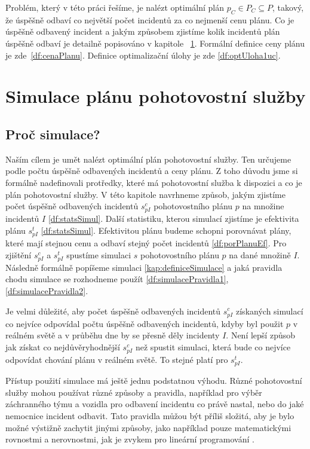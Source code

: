Problém, který v této práci řešíme, je nalézt optimální plán $p_C \in P_C \subseteq P$, takový, že úspěšně odbaví co největší počet incidentů za co nejmenší cenu plánu.
Co je úspěšně odbavený incident a jakým způsobem zjistíme kolik incidentů plán úspěšně odbaví je detailně popisováno v kapitole ~\ref{SimulaceKap}.
Formální definice ceny plánu je zde~\ref{df:cenaPlanu}.
Definice optimalizační úlohy je zde \ref{df:optUloha1uc}.

\section{Simulace plánu pohotovostní služby}\label{SimulaceKap}

\subsection{Proč simulace?}\label{kap:procSimulace}

Naším cílem je umět nalézt optimální plán pohotovostní služby.
Ten určujeme podle počtu úspěšně odbavených incidentů a ceny plánu.
Z toho důvodu jsme si formálně nadefinovali protředky, které má pohotovostní služba k dispozici a co je plán pohotovostní služby.
V této kapitole navrhneme způsob, jakým zjistíme počet úspěšně odbavených incidentů $s^c_{pI}$ pohotovostního plánu $p$ na množine incidentů $I$ \ref{df:statsSimul}.
Další statistiku, kterou simulací zjistíme je efektivita plánu $s^t_{pI}$ \ref{df:statsSimul}.
Efektivitou plánu budeme schopni porovnávat plány, které mají stejnou cenu a odbaví stejný počet incidentů \ref{df:porPlanuEf}.
Pro zjištění $s^c_{pI}$ a $s^t_{pI}$ spustíme simulaci $s$ pohotovostního plánu $p$ na dané množině $I$.
Následně formálně popíšeme simulaci \ref{kap:definiceSimulace} a jaká pravidla chodu simulace se rozhodneme použít \ref{df:simulacePravidla1}, \ref{df:simulacePravidla2}.

Je velmi důležité, aby počet úspěšně odbavených incidentů $s^c_{pI}$ získaných simulací co nejvíce odpovídal počtu úspěšně odbavených incidentů,
kdyby byl použit $p$ v reálném světě a v průběhu dne by se přesně děly incidenty $I$.
Není lepší způsob jak získat co nejdůvěryhodnější $s^c_{pI}$ než spustit simulaci, která bude co nejvíce odpovídat chování plánu v reálném světě.
To stejné platí pro $s^t_{pI}$.

Přístup použití simulace má ještě jednu podstatnou výhodu.
Různé pohotovostní služby mohou používat různé způsoby a pravidla, například pro výběr záchranného týmu a vozidla pro odbavení incidentu co právě nastal, nebo do jaké nemocnice incident odbavit.
Tato pravidla můžou být příliš složitá, aby je bylo možné výstižně zachytit jinými způsoby, jako například pouze matematickými rovnostmi a nerovnostmi, jak je zvykem pro lineární programování \cite{LP}.


